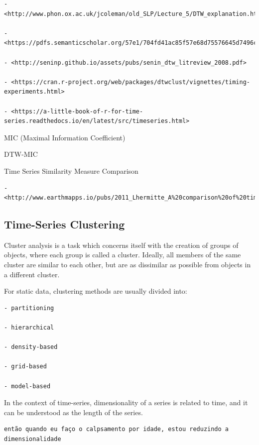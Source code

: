 \documentclass[
]{book}
\begin{document}
\begin{verbatim}
- <http://www.phon.ox.ac.uk/jcoleman/old_SLP/Lecture_5/DTW_explanation.html>

- <https://pdfs.semanticscholar.org/57e1/704fd41ac85f57e68d75576645d7496c4e55.pdf>

- <http://seninp.github.io/assets/pubs/senin_dtw_litreview_2008.pdf>

- <https://cran.r-project.org/web/packages/dtwclust/vignettes/timing-experiments.html>

- <https://a-little-book-of-r-for-time-series.readthedocs.io/en/latest/src/timeseries.html>
\end{verbatim}

MIC (Maximal Information Coefficient)

DTW-MIC

Time Series Similarity Measure Comparison

\begin{verbatim}
- <http://www.earthmapps.io/pubs/2011_Lhermitte_A%20comparison%20of%20time%20series.pdf>
\end{verbatim}

\hypertarget{time-series-clustering}{%
\subsection{Time-Series Clustering}\label{time-series-clustering}}

Cluster analysis is a task which concerns itself with the creation of groups of objects, where each group is called a cluster. Ideally, all members of the same cluster are similar to each other, but are as dissimilar as possible from objects in a different cluster.

For static data, clustering methods are usually divided into:

\begin{verbatim}
- partitioning

- hierarchical

- density-based

- grid-based

- model-based
\end{verbatim}

In the context of time-series, dimensionality of a series is related to time, and it can be understood as the length of the series.

\begin{verbatim}
então quando eu faço o calpsamento por idade, estou reduzindo a dimensionalidade
\end{verbatim}
\end{document}

